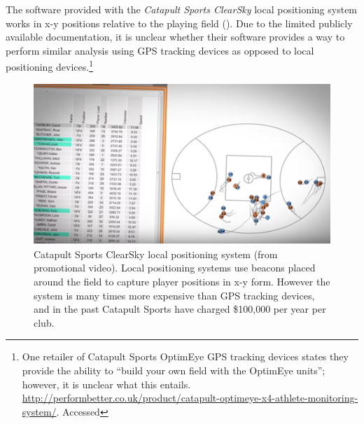 The software provided with the \textit{Catapult Sports ClearSky} local positioning system works in x-y positions relative to the playing field (). Due to the limited publicly available documentation, it is unclear whether their software provides a way to perform similar analysis using GPS tracking devices as opposed to local positioning devices.\footnote{One retailer of Catapult Sports OptimEye GPS tracking devices states they provide the ability to ``build your own field with the OptimEye units''; however, it is unclear what this entails. \url{http://performbetter.co.uk/product/catapult-optimeye-x4-athlete-monitoring-system/}. Accessed }



\begin{figure}[htb]
\centering
\includegraphics[width=0.9\linewidth]{figs/spatial/catapault-sports.png}
\caption[Catapult Sports ClearSky local positioning system]{Catapult Sports ClearSky local positioning system (from promotional video\protect\footnotemark{}). Local positioning systems use beacons placed around the field to capture player positions in x-y form. However the system is many times more expensive than GPS tracking devices, and in the past Catapult Sports have charged \$100,000 per year per club.\protect\footnotemark{} 
\label{fig:catapault-sports}}
\end{figure}
\addtocounter{footnote}{-1}
\addtocounter{footnote}{1}

